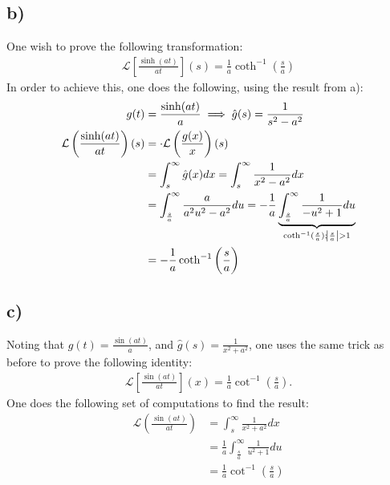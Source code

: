 \documentclass{article}
\begin{document}
\subsection*{b)}
One wish to prove the following transformation:
\begin{align*}
    \mathcal{L}\left[\frac{\sinh(at)}{at}\right](s) = \frac{1}{a}\coth^{-1}\left(\frac{s}{a}\right)
\end{align*}In order to achieve this, one does the following, using the result from a):
\begin{align*}
    g(t) &= \frac{\sinh(at)}{a}\implies \hat{g}(s) = \frac{1}{s^2 - a^2}\\
    \mathcal{L}\left(\frac{\sinh(at)}{at}\right)(s)&=\cdot\mathcal{L}\left(\frac{g(x)}{x}\right)(s)\\
    &=\int_s^\infty \hat{g}(x)dx = \int_s^\infty \frac{1}{x^2 - a^2}dx\\
    &= \int_{\frac{s}{a}}^\infty \frac{a}{a^2u^2 - a^2}du = -\frac{1}{a}\underbrace{\int_{\frac{s}{a}}^\infty \frac{1}{-u^2 + 1}du}_{\coth^{-1}(\frac{s}{a}); \abs{\frac{s}{a}}>1}\\
    &= -\frac{1}{a}\coth^{-1}\left(\frac{s}{a}\right)
\end{align*}
\subsection*{c)}
Noting that $g(t) = \frac{\sin(at)}{a}$, and $\hat{g}(s) = \frac{1}{x^2 + a^2}$, one uses the same trick as before to prove the following identity:
\begin{align*}
    \mathcal{L}\left[\frac{\sin(at)}{at}\right](x) = \frac{1}{a}\cot^{-1}\left(\frac{s}{a}\right).
\end{align*}One does the following set of computations to find the result:
\begin{align*}
    \mathcal{L}\left(\frac{\sin(at)}{at}\right) &= \int_s^\infty \frac{1}{x^2 + a^2}dx\\
    &= \frac{1}{a}\int_{\frac{s}{a}}^\infty \frac{1}{u^2 + 1}du\\
    &=\frac{1}{a}\cot^{-1}\left(\frac{s}{a}\right)
\end{align*}
\end{document}
